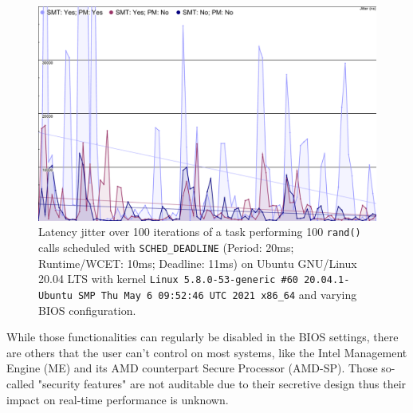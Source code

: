 \documentclass[a4paper,12pt]{report}
\newcommand{\comment}[1]{}
\begin{document}
\begin{figure}[H]
    \centering
    \includegraphics[width=\textwidth]{img/smt-pm-chart.pdf}
    \caption{Latency jitter over 100 iterations of a task performing 100 \texttt{rand()} calls scheduled with \texttt{SCHED\_DEADLINE} (Period: 20ms; Runtime/WCET: 10ms; Deadline: 11ms) on Ubuntu GNU/Linux 20.04 LTS with kernel \texttt{Linux 5.8.0-53-generic \#60~20.04.1-Ubuntu SMP Thu May 6 09:52:46 UTC 2021 x86\_64} and varying BIOS configuration.}
\end{figure}

While those functionalities can regularly be disabled in the BIOS settings, there are others that the user can't control on most systems, like the Intel Management Engine (ME) and its AMD counterpart Secure Processor (AMD-SP). Those so-called "security features" are not auditable due to their secretive design thus their impact on real-time performance is unknown.

\comment{
\subsection{Filesystem and I/O performance}

While the I/O architecture of Linux has been well documented and analyzed in the literature, the impact of disk I/O, and specifically of the filesystem on application, performance has not. The lack of research material in this field can probably be attributed to the rarity of real-time disk I/O bound workloads, but it's an interesting topic nonetheless.
}


\printbibliography[title={References}]
\end{document}
